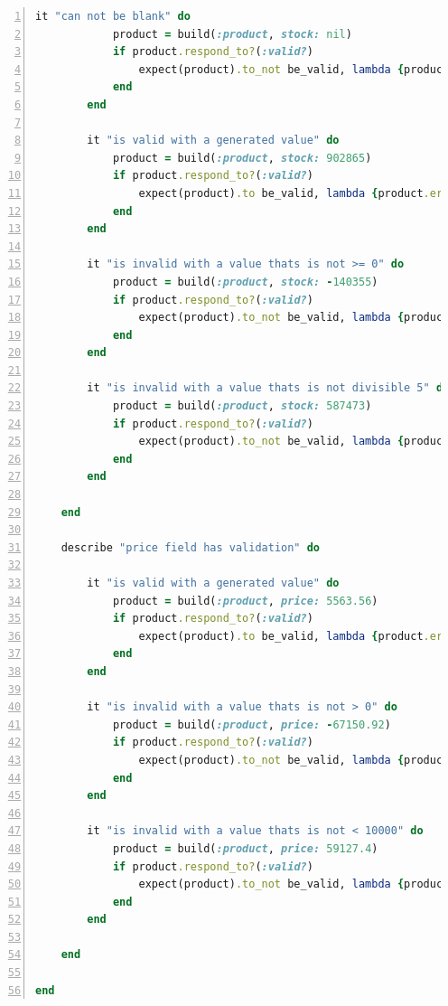 \documentclass[a4paper,12pt]{article}
\begin{document}
\begin{lstlisting}[frame=single,numbers=left,language = ruby,caption= {Test suite output for Product defined in chapter 6}, label={code:nice}]
		it "can not be blank" do 
			product = build(:product, stock: nil)
			if product.respond_to?(:valid?)
				expect(product).to_not be_valid, lambda {product.errors.full_messages.join("\n")}
			end
		end

		it "is valid with a generated value" do
			product = build(:product, stock: 902865)
			if product.respond_to?(:valid?)
				expect(product).to be_valid, lambda {product.errors.full_messages.join("\n")}
			end
		end

		it "is invalid with a value thats is not >= 0" do
			product = build(:product, stock: -140355)
			if product.respond_to?(:valid?)
				expect(product).to_not be_valid, lambda {product.errors.full_messages.join("\n")}
			end
		end

		it "is invalid with a value thats is not divisible 5" do
			product = build(:product, stock: 587473)
			if product.respond_to?(:valid?)
				expect(product).to_not be_valid, lambda {product.errors.full_messages.join("\n")}
			end
		end

	end

	describe "price field has validation" do

		it "is valid with a generated value" do
			product = build(:product, price: 5563.56)
			if product.respond_to?(:valid?)
				expect(product).to be_valid, lambda {product.errors.full_messages.join("\n")}
			end
		end

		it "is invalid with a value thats is not > 0" do
			product = build(:product, price: -67150.92)
			if product.respond_to?(:valid?)
				expect(product).to_not be_valid, lambda {product.errors.full_messages.join("\n")}
			end
		end

		it "is invalid with a value thats is not < 10000" do
			product = build(:product, price: 59127.4)
			if product.respond_to?(:valid?)
				expect(product).to_not be_valid, lambda {product.errors.full_messages.join("\n")}
			end
		end

	end

end
\end{lstlisting}



\end{document}
